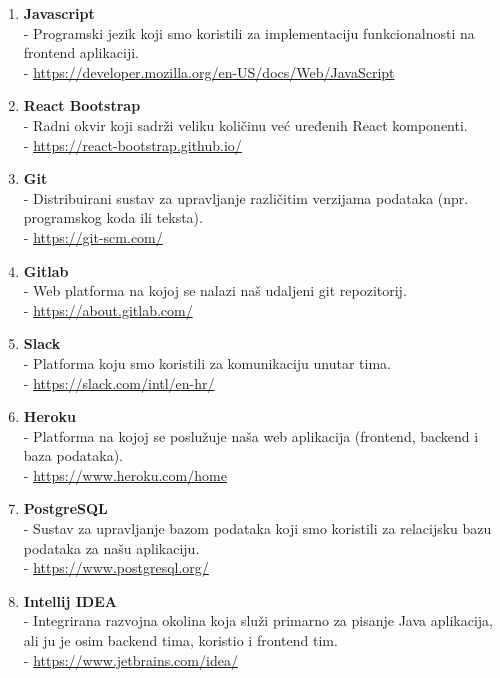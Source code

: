 \begin{enumerate}
				\item \textbf{Javascript} \\
				- Programski jezik koji smo koristili za implementaciju funkcionalnosti na frontend aplikaciji.\\
				- \url{https://developer.mozilla.org/en-US/docs/Web/JavaScript}
				
				\item \textbf{React Bootstrap}\\
				- Radni okvir koji sadrži veliku količinu već uređenih React komponenti.\\
				- \url{https://react-bootstrap.github.io/}
				
				\item \textbf{Git}\\
				- Distribuirani sustav za upravljanje različitim verzijama podataka (npr. programskog koda ili teksta).\\
				- \url{https://git-scm.com/}
				
				\item \textbf{Gitlab}\\
				- Web platforma na kojoj se nalazi naš udaljeni git repozitorij.\\
				- \url{https://about.gitlab.com/}
				
				\item \textbf{Slack}\\
				- Platforma koju smo koristili za komunikaciju unutar tima.\\
				- \url{https://slack.com/intl/en-hr/}
				
				\item \textbf{Heroku}\\
				- Platforma na kojoj se poslužuje naša web aplikacija (frontend, backend i baza podataka).\\
				- \url{https://www.heroku.com/home}
				
				\item \textbf{PostgreSQL}\\
				- Sustav za upravljanje bazom podataka koji smo koristili za relacijsku bazu podataka za našu aplikaciju.\\
				- \url{https://www.postgresql.org/}
				
				\item \textbf{Intellij IDEA}\\
				- Integrirana razvojna okolina koja služi primarno za pisanje Java aplikacija, ali ju je osim backend tima, koristio i frontend tim.\\
				- \url{https://www.jetbrains.com/idea/}
				

\end{enumerate}

